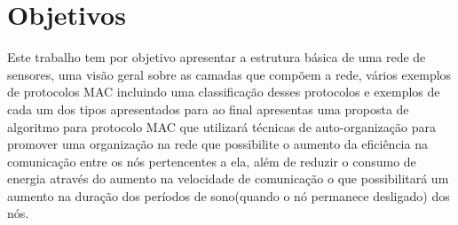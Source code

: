 \section{Objetivos}

Este trabalho tem por objetivo apresentar a estrutura básica de uma rede de sensores, uma visão geral sobre as camadas que compõem a rede, vários exemplos de protocolos MAC incluindo uma classificação desses protocolos e exemplos de cada um dos tipos apresentados para ao final apresentas uma proposta de algoritmo para protocolo MAC que utilizará técnicas de auto-organização para promover uma organização na rede que possibilite o aumento da eficiência na comunicação entre os nós pertencentes a ela, além de reduzir o consumo de energia através do aumento na velocidade de comunicação o que possibilitará um aumento na duração dos períodos de sono(quando o nó permanece desligado) dos nós.
